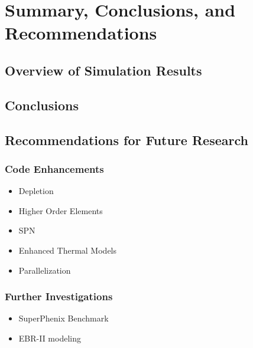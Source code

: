 \chapter{Summary, Conclusions, and Recommendations}
\label{ch:conclusions}

\section{Overview of Simulation Results}

\section{Conclusions}

\section{Recommendations for Future Research}

  \subsection{Code Enhancements}
    \begin{itemize}
      \item Depletion
      \item Higher Order Elements
      \item SPN
      \item Enhanced Thermal Models
      \item Parallelization
    \end{itemize}

  \subsection{Further Investigations}
    \begin{itemize}
      \item SuperPhenix Benchmark
      \item EBR-II modeling
    \end{itemize}
